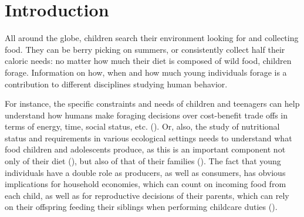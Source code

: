 \section{Introduction}
All around the globe, children search their environment looking for and collecting food. 
They can be berry picking on summers, or consistently collect half their caloric needs: no matter how much their diet is composed of wild food, children forage. 
Information on how, when and how much young individuals forage is a contribution to different disciplines studying human behavior.

For instance, the specific constraints and needs of children and teenagers can help understand how humans make foraging decisions over cost-benefit trade offs in terms of energy, time, social status, etc. (\cite{bliege_bird_children_1995, bird_ethnoarchaeology_2000, bird_children_2002}).
Or, also, the study of nutritional status and requirements in various ecological settings needs to understand what food children and adolescents produce, as this is an important component not only of their diet (\cite{pollom_changes_2020, pollom_effects_2020, mcgarry_children_2009}),
but also of that of their families (\cite{fouts_who_2009}). 
The fact that young individuals have a double role as producers, as well as consumers, has obvious implications for household economies, which can count on incoming food from each child, as well as for reproductive decisions of their parents, which can rely on their offspring feeding their siblings when performing childcare duties (\cite{kramer_variation_2002, kramer_maya_2005, kramer_childrens_2005, kramer_does_2009, crittenden_juvenile_2013}). 

